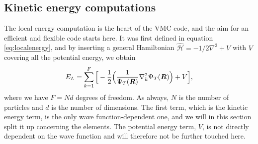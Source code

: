 \subsection{Kinetic energy computations} \label{sec:kinetic}
The local energy computation is the heart of the VMC code, and the aim for an efficient and flexible code starts here. It was first defined in equation \eqref{eq:localenergy}, and by inserting a general Hamiltonian $\hat{\mathcal{H}}=-1/2\nabla^2+V$ with $V$ covering all the potential energy, we obtain
\begin{equation}
E_L=\sum_{k=1}^F\Big[-\frac{1}{2}\Big(\frac{1}{\Psi_T(\boldsymbol{{R}})}\nabla_k^2\Psi_T(\boldsymbol{{R}})\Big) + V\Big],
\end{equation}
where we have $F=Nd$ degrees of freedom. As always, $N$ is the number of particles and $d$ is the number of dimensions. The first term, which is the kinetic energy term, is the only wave function-dependent one, and we will in this section split it up concerning the elements. The potential energy term, $V$, is not directly dependent on the wave function and will therefore not be further touched here. 

